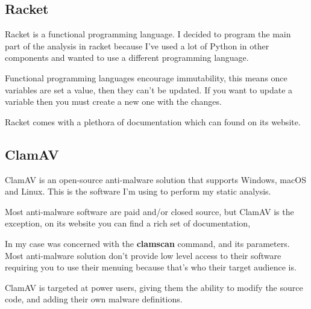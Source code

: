 \subsection{Racket}
Racket is a functional programming language. I decided to program the main part of the analysis in racket because I've used a lot of Python in other components and wanted to use a different programming language.

Functional programming languages encourage immutability,
this means once variables are set a value, then they can't be updated.
If you want to update a variable then you must create a new one with
the changes.

Racket comes with a plethora of documentation which can found on its website.


\subsection{ClamAV}
ClamAV is an open-source anti-malware solution that
supports Windows, macOS and Linux.
This is the software I'm using to perform my static analysis.

Most anti-malware software are paid and/or closed source,
but ClamAV is the exception, on its website you can find a rich set of documentation,

In my case was concerned with the \textbf{clamscan} command, and its parameters.
Most anti-malware solution don't provide low level access to their software
requiring you to use their menuing because that's who their target audience is.

ClamAV is targeted at power users, giving them the ability to modify the source code,
and adding their own malware definitions.
